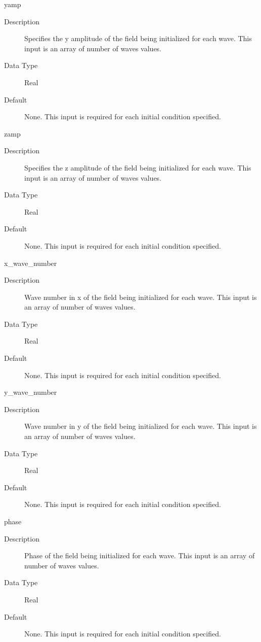 \documentclass[11pt]{amsart}
\begin{document}
yamp
\begin{description}
\item [Description] Specifies the y amplitude of the field being initialized for
each wave.  This input is an array of number of waves values.
\item [Data Type] Real
\item [Default] None.  This input is required for each initial condition
specified.
\end{description}

zamp
\begin{description}
\item [Description] Specifies the z amplitude of the field being initialized for
each wave.  This input is an array of number of waves values.
\item [Data Type] Real
\item [Default] None.  This input is required for each initial condition
specified.
\end{description}

x\_wave\_number
\begin{description}
\item [Description] Wave number in x of the field being initialized for each
 wave.  This input is an array of number of waves values.
\item [Data Type] Real
\item [Default] None.  This input is required for each initial condition
specified.
\end{description}

y\_wave\_number
\begin{description}
\item [Description] Wave number in y of the field being initialized for each
wave.  This input is an array of number of waves values.
\item [Data Type] Real
\item [Default] None.  This input is required for each initial condition
specified.
\end{description}

phase
\begin{description}
\item [Description] Phase of the field being initialized for each wave.  This
input is an array of number of waves values.
\item [Data Type] Real
\item [Default] None.  This input is required for each initial condition
specified.
\end{description}
\end{document}
